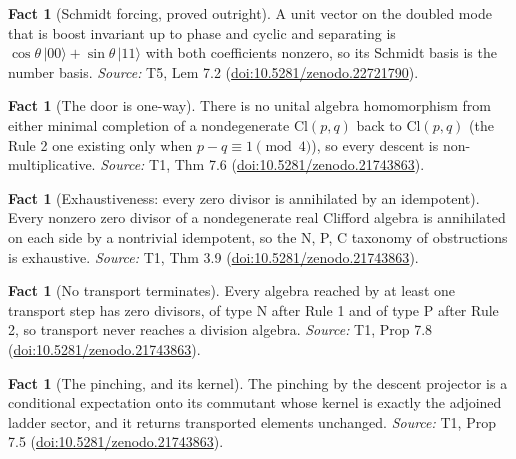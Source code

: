 \documentclass[11pt]{article}
\theoremstyle{definition}
\newtheorem{fact}[theorem]{Fact}
\theoremstyle{plain}
\providecommand{\Cl}{}\renewcommand{\Cl}{\mathrm{Cl}}
\begin{document}
\begin{fact}[Schmidt forcing, proved outright]\label{c:singularity.schmidt-forcing-proved-outright}
A unit vector on the doubled mode that is boost invariant up to phase and cyclic and separating is $\cos\theta\,|00\rangle + \sin\theta\,|11\rangle$ with both coefficients nonzero, so its Schmidt basis is the number basis.
\emph{Source:} T5, Lem 7.2 (\href{https://doi.org/10.5281/zenodo.22721790}{doi:10.5281/zenodo.22721790}).
\end{fact}

\begin{fact}[The door is one-way]\label{c:transport.door-one-way}
There is no unital algebra homomorphism from either minimal completion of a nondegenerate $\Cl(p,q)$ back to $\Cl(p,q)$ (the Rule 2 one existing only when $p - q \equiv 1 \pmod 4$), so every descent is non-multiplicative.
\emph{Source:} T1, Thm 7.6 (\href{https://doi.org/10.5281/zenodo.21743863}{doi:10.5281/zenodo.21743863}).
\end{fact}

\begin{fact}[Exhaustiveness: every zero divisor is annihilated by an idempotent]\label{c:transport.exhaustiveness-every-zero-divisor-annihilated-idempotent}
Every nonzero zero divisor of a nondegenerate real Clifford algebra is annihilated on each side by a nontrivial idempotent, so the N, P, C taxonomy of obstructions is exhaustive.
\emph{Source:} T1, Thm 3.9 (\href{https://doi.org/10.5281/zenodo.21743863}{doi:10.5281/zenodo.21743863}).
\end{fact}

\begin{fact}[No transport terminates]\label{c:transport.no-transport-terminates}
Every algebra reached by at least one transport step has zero divisors, of type N after Rule 1 and of type P after Rule 2, so transport never reaches a division algebra.
\emph{Source:} T1, Prop 7.8 (\href{https://doi.org/10.5281/zenodo.21743863}{doi:10.5281/zenodo.21743863}).
\end{fact}

\begin{fact}[The pinching, and its kernel]\label{c:transport.pinching-kernel}
The pinching by the descent projector is a conditional expectation onto its commutant whose kernel is exactly the adjoined ladder sector, and it returns transported elements unchanged.
\emph{Source:} T1, Prop 7.5 (\href{https://doi.org/10.5281/zenodo.21743863}{doi:10.5281/zenodo.21743863}).
\end{fact}
\end{document}
